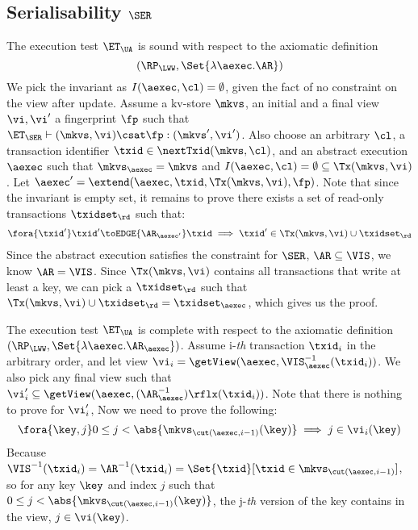 \subsection{Serialisability \( \SER \)}
\label{sec:sound-complete-ser}

The execution test $\ET_\UA$ is sound with respect to the axiomatic definition 
\[ 
    (\RP_{\LWW}, \Set{\lambda \aexec. \AR })
\]
We pick the invariant as \( I( \aexec, \cl ) = \emptyset \), given the fact of no constraint on the view after update.
Assume a kv-store $\mkvs$, an initial and a final view $\vi, \vi'$  a fingerprint $\fp$ 
such that $\ET_{\SER} \vdash (\mkvs, \vi) \csat \fp: (\mkvs',\vi')$. 
Also choose an arbitrary $\cl$, a transaction identifier $\txid \in \nextTxid(\mkvs, \cl)$, 
and an abstract execution $\aexec$ such that $\mkvs_{\aexec} = \mkvs$ and 
\( I(\aexec, \cl) =  \emptyset \subseteq \Tx(\mkvs, \vi) \).
Let \( \aexec' = \extend(\aexec, \txid, \Tx(\mkvs, \vi), \fp ) \).
Note that since the invariant is empty set, it remains to prove there exists a set of read-only transactions \( \txidset_\rd \) such that:
\[
    \begin{array}{@{}l@{}}
        \fora{ \txid' } 
        \txid' \toEDGE{\AR_{\aexec'}} \txid \implies \txid' \in \Tx(\mkvs, \vi) \cup \txidset_\rd
    \end{array}
\]
Since the abstract execution satisfies the constraint for \( \SER \), \ie \( \AR \subseteq \VIS \), we know \( \AR = \VIS \).
Since \( \Tx(\mkvs, \vi)  \) contains all transactions that write at least a key, 
we can pick a \( \txidset_\rd \) such that \( \Tx(\mkvs, \vi) \cup \txidset_\rd = \txidset_\aexec\),
which gives us the proof.


The execution test $\ET_\UA$ is complete with respect to the axiomatic definition \( (\RP_{\LWW}, \Set{\lambda \aexec. \AR_\aexec }) \).
Assume i-\emph{th} transaction \( \txid_i \) in the arbitrary order,
and let view \( \vi_{i} = \getView(\aexec, \VIS^{-1}_{\aexec}(\txid_{i}) ) \).
We also pick any final view such that \( \vi'_{i} \subseteq \getView(\aexec, (\AR^{-1}_{\aexec})\rflx(\txid_{i}) ) \).
Note that there is nothing to prove for \( \vi'_i \),
Now we need to prove the following:
\[
    \fora{\key, j}  0 \leq j < \abs{\mkvs_{\cut(\aexec, i-1)}(\key)} \implies j \in \vi_i(\key)
\]
Because \( \VIS^{-1}(\txid_i) = \AR^{-1}(\txid_i) = \Set{\txid }[\txid \in \mkvs_{\cut(\aexec, i-1)} ]\),
so for any key \( \key \) and index \( j \) such that \( 0 \leq j < \abs{\mkvs_{\cut(\aexec, i-1)}(\key)} \),
the j-\emph{th} version of the key contains in the view, \ie \( j \in \vi(\key)\).

